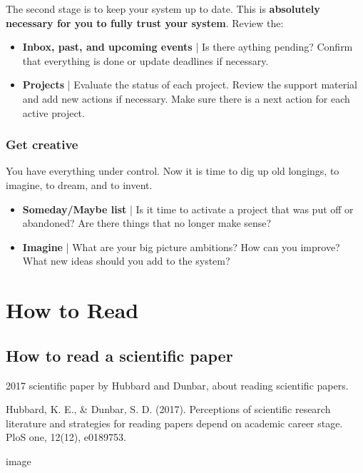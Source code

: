 The second stage is to keep your system up to date. This is \textbf{absolutely necessary for you to fully trust your system}. Review the:
\begin{itemize}
\item
	\textbf{Inbox, past, and upcoming events} | Is there aything pending? Confirm that everything is done or update deadlines if necessary.
\item
	\textbf{Projects} | Evaluate the status of each project. Review the support material and add new actions if necessary. Make sure there is a next action for each active project.
\end{itemize}

\subsubsection*{Get creative}
You have everything under control. Now it is time to dig up old longings, to imagine, to dream, and to invent.
\begin{itemize}
\item \textbf{Someday/Maybe list} | Is it time to activate a project that was put off or abandoned? Are there things that no longer make sense?

\item \textbf{Imagine} | What are your big picture ambitions? How can you improve? What new ideas should you add to the system?

\end{itemize}

\section{How to Read}

\subsection{How to read a scientific paper}
 2017 scientific paper by Hubbard and Dunbar, about reading scientific papers.

 Hubbard, K. E., \& Dunbar, S. D. (2017). Perceptions of scientific research literature and strategies for reading papers depend on academic career stage. PloS one, 12(12), e0189753.

 image

